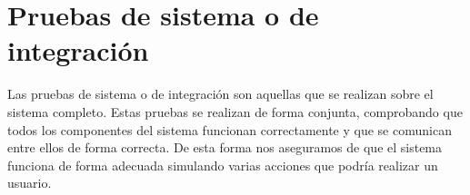 \section*{Pruebas de sistema o de integración}
\label{sec:pruebas-sistema}
Las pruebas de sistema o de integración son aquellas que se realizan sobre el sistema completo. Estas pruebas se realizan de forma conjunta, comprobando que todos los componentes del sistema funcionan correctamente y que se comunican entre ellos de forma correcta.
De esta forma nos aseguramos de que el sistema funciona de forma adecuada simulando varias acciones que podría realizar un usuario.
